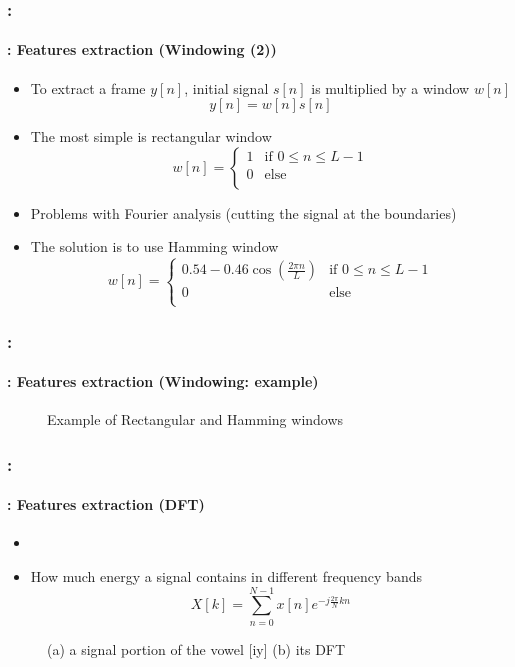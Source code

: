 \documentclass[xcolor=table]{beamer}
\begin{document}
\begin{frame}
	\frametitle{\insertshortsubtitle: \insertsection}
	\framesubtitle{\insertsubsection: Features extraction (Windowing (2))}
	
	\begin{itemize}
		\item To extract a frame $y[n]$, initial signal $s[n]$ is multiplied by a window $w[n]$ 
		\[y[n] = w[n] s[n]\]
		\item The most simple is rectangular window 
		\[w[n] = \begin{cases}
			1 & \text{if } 0 \le n \le L-1 \\
			0 & \text{else}\\
		\end{cases}\]
		\item Problems with Fourier analysis (cutting the signal at the boundaries)
		\item The solution is to use Hamming window
		\[w[n] = \begin{cases}
			0.54 - 0.46 \cos (\frac{2\pi n}{L}) & \text{if } 0 \le n \le L-1 \\
			0 & \text{else}\\
		\end{cases}\]
	\end{itemize}

\end{frame}

\begin{frame}
	\frametitle{\insertshortsubtitle: \insertsection}
	\framesubtitle{\insertsubsection: Features extraction (Windowing: example)}
	
	\begin{figure}
		\centering
		\caption{Example of Rectangular and Hamming windows \cite{2020-jurafsky-martin}}
	\end{figure}
	
\end{frame}

\begin{frame}
	\frametitle{\insertshortsubtitle: \insertsection}
	\framesubtitle{\insertsubsection: Features extraction (DFT)}
	
	\begin{itemize}
		\item {}
		\item How much energy a signal contains in different frequency bands
		\[X[k] = \sum\limits_{n=0}^{N-1} x[n] e^{-j\frac{2\pi}{N} k n}\]
	\end{itemize}
	\begin{figure}
		\centering
		\caption{(a) a signal portion of the vowel [iy] (b) its DFT \cite{2020-jurafsky-martin}}
	\end{figure}

\end{frame}
\end{document}
